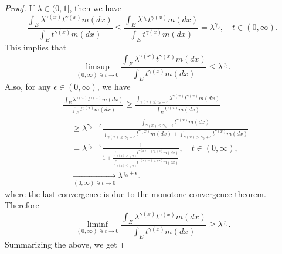 \documentclass[12pt, a4paper]{amsart}
\theoremstyle{definition}
\numberwithin{equation}{section}
\begin{document}
\begin{proof}
	If $\lambda \in (0,1]$, then we have
\begin{equation}
	\frac{\int_E \lambda^{\gamma(x)} t^{\gamma(x)} m(dx)}{\int_E t^{\gamma(x)} m(dx)}
	\leq \frac{\int_E \lambda^{\gamma_0} t^{\gamma(x)} m(dx)}{\int_E t^{\gamma(x)} m(dx)}
	= \lambda^{\gamma_0},
	\quad t\in (0,\infty).
\end{equation}
	This implies that
\begin{equation}
	\limsup_{(0,\infty) \ni t\to 0}\frac{\int_E \lambda^{\gamma(x)} t^{\gamma(x)} m(dx)}{\int_E t^{\gamma(x)} m(dx)}
	\leq \lambda ^{\gamma_0}.
\end{equation}
	Also, for any $\epsilon \in (0,\infty)$, we have
\begin{equation}\begin{split}
	&\frac{\int_E \lambda^{\gamma(x)} t^{\gamma(x)} m(dx)}{\int_E t^{\gamma(x)} m(dx)}
	\geq \frac{ \int_{ \gamma(x) \leq  \gamma_0 + \epsilon } \lambda^{ \gamma(x) } t^{ \gamma(x)} m(dx) } { \int_E t^{ \gamma(x) } m(dx) }
	\\&\quad \geq \lambda^{ \gamma_0 + \epsilon} \frac{ \int_{ \gamma(x) \leq \gamma_0 + \epsilon } t^{ \gamma(x)} m(dx) } { \int_{ \gamma(x) \leq \gamma_0 + \epsilon}t^{\gamma(x)}m(dx)+ \int_{\gamma(x) > \gamma_0 + \epsilon} t^{\gamma(x)}m(dx)}
	\\&\quad = \lambda^{\gamma_0 + \epsilon} \frac{1}{1+ \frac{\int_{\gamma(x) > \gamma_0 + \epsilon}t^{\gamma(x) - (\gamma_0 + \epsilon)}m(dx)}{\int_{\gamma(x) \leq \gamma_0 + \epsilon}t^{\gamma(x)- (\gamma_0 + \epsilon)}m(dx)}},
	\quad t\in (0, \infty),
	\\&\quad \xrightarrow[(0,\infty) \ni t\to 0]{} \lambda ^{\gamma_0 + \epsilon}.
\end{split}\end{equation}
	where the last convergence is due to the monotone convergence theorem.
	Therefore
\begin{equation}
	\liminf_{(0,\infty) \ni t\to 0}\frac{\int_E \lambda^{\gamma(x)} t^{\gamma(x)} m(dx)}{\int_E t^{\gamma(x)} m(dx)}
	\geq \lambda ^{\gamma_0}. 
\end{equation}
	Summarizing the above,  we get

\end{proof}
\end{document}
